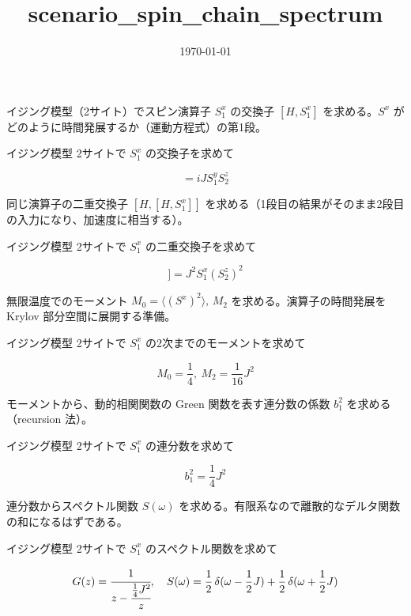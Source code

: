 \documentclass[dvipdfmx,a4paper,11pt]{jsarticle}
\title{scenario\_spin\_chain\_spectrum}
\date{\today}
\begin{document}
\maketitle

イジング模型（2サイト）でスピン演算子 $S^x_1$ の交換子 $[H,S^x_1]$ を求める。$S^x$ がどのように時間発展するか（運動方程式）の第1段。

イジング模型 2サイトで $S^x_1$ の交換子を求めて

\begin{equation}
  [H, S^{x}_{1}] = i J S^{y}_{1} S^{z}_{2}
  \label{eq:E1}
\end{equation}

同じ演算子の二重交換子 $[H,[H,S^x_1]]$ を求める（1段目の結果がそのまま2段目の入力になり、加速度に相当する）。

イジング模型 2サイトで $S^x_1$ の二重交換子を求めて

\begin{equation}
  [H, [H, S^{x}_{1}]] = J^{2} S^{x}_{1} \left(S^{z}_{2}\right)^{2}
  \label{eq:E2}
\end{equation}

無限温度でのモーメント $M_0=\langle(S^x)^2\rangle,\,M_2$ を求める。演算子の時間発展を Krylov 部分空間に展開する準備。

イジング模型 2サイトで $S^x_1$ の2次までのモーメントを求めて

\begin{equation}
  M_{0} = \frac{1}{4},\ M_{2} = \frac{1}{16} J^{2}
  \label{eq:E3}
\end{equation}

モーメントから、動的相関関数の Green 関数を表す連分数の係数 $b_1^2$ を求める（recursion 法）。

イジング模型 2サイトで $S^x_1$ の連分数を求めて

\begin{equation}
  b_{1}^2 = \frac{1}{4} J^{2}
  \label{eq:E4}
\end{equation}

連分数からスペクトル関数 $S(\omega)$ を求める。有限系なので離散的なデルタ関数の和になるはずである。

イジング模型 2サイトで $S^x_1$ のスペクトル関数を求めて

\begin{equation}
  G(z) = \cfrac{1}{z - \cfrac{\frac{1}{4} J^{2}}{z}},\quad S(\omega) = \frac{1}{2}\,\delta(\omega - \frac{1}{2} J) + \frac{1}{2}\,\delta(\omega + \frac{1}{2} J)
  \label{eq:E5}
\end{equation}
\end{document}
